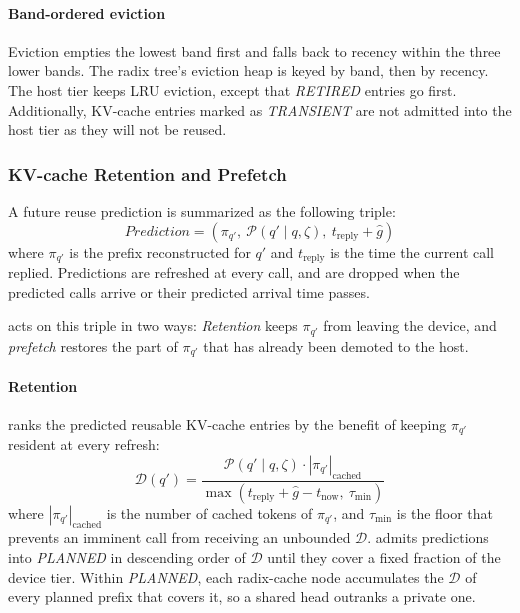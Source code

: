 \paragraph{Band-ordered eviction}
Eviction empties the lowest band first and falls back to recency within the three lower bands. The radix tree's eviction heap is keyed by band, then by recency. The host tier keeps LRU eviction, except that \emph{RETIRED} entries go first. Additionally, KV-cache entries marked as \emph{TRANSIENT} are not admitted into the host tier as they will not be reused.

\subsubsection{KV-cache Retention and Prefetch}
A future reuse prediction is summarized as the following triple:
\[
\textit{Prediction}=\left(\pi_{q'},\ \mathcal{P}(q'\mid q,\zeta),\ t_{\mathrm{reply}}+\hat{g}\right)
\]
where $\pi_{q'}$ is the prefix reconstructed for $q'$ and $t_{\mathrm{reply}}$ is the time the current call replied. Predictions are refreshed at every call, and are dropped when the predicted calls arrive or their predicted arrival time passes. 

\sysname acts on this triple in two ways: \emph{Retention} keeps $\pi_{q'}$ from leaving the device, and \emph{prefetch} restores the part of $\pi_{q'}$ that has already been demoted to the host.

\paragraph{Retention}
\sysname ranks the predicted reusable KV-cache entries by the benefit of keeping $\pi_{q'}$ resident at every refresh:
\[
\mathcal{D}(q')=\frac{\mathcal{P}(q'\mid q,\zeta)\cdot |\pi_{q'}|_{\mathrm{cached}}}{\max\!\left(t_{\mathrm{reply}}+\hat{g}-t_{\mathrm{now}},\ \tau_{\min}\right)}
\]
where $|\pi_{q'}|_{\mathrm{cached}}$ is the number of cached tokens of $\pi_{q'}$, and $\tau_{\min}$ is the floor that prevents an imminent call from receiving an unbounded $\mathcal{D}$. \sysname admits predictions into \emph{PLANNED} in descending order of $\mathcal{D}$ until they cover a fixed fraction of the device tier. Within \emph{PLANNED}, each radix-cache node accumulates the $\mathcal{D}$ of every planned prefix that covers it, so a shared head outranks a private one.


